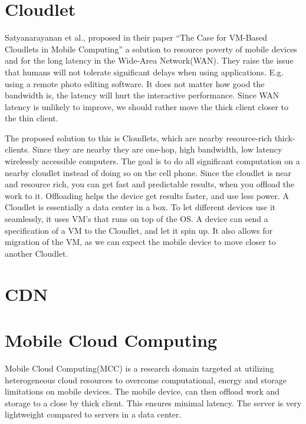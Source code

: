 

\section{Cloudlet} \label{cloudlet} 
Satyanarayanan et al., proposed in their paper “The Case for VM-Based Cloudlets in Mobile Computing”\cite{satyanarayanan_case_2009} a solution to resource poverty of mobile devices and for the long latency in the Wide-Area Network(WAN). They raise the issue that humans will not tolerate significant delays when using applications. E.g. using a remote photo editing software. It does not matter how good the bandwidth is, the latency will hurt the interactive performance. Since WAN latency is unlikely to improve, we should rather move the thick client closer to the thin client. 

The proposed solution to this is Cloudlets, which are nearby resource-rich thick-clients. Since they are nearby they are one-hop, high bandwidth, low latency wirelessly accessible computers. The goal is to do all significant computation on a nearby cloudlet instead of doing so on the cell phone. Since the cloudlet is near and resource rich, you can get fast and predictable results, when you offload the work to it. Offloading helps the device get results faster, and use less power. A Cloudlet is essentially a data center in a box. To let different devices use it seamlessly, it uses VM’s that runs on top of the OS. A device can send a specification of a VM to the Cloudlet, and let it spin up. It also allows for migration of the VM, as we can expect the mobile device to move closer to another Cloudlet.


\section{CDN}


\section{Mobile Cloud Computing}
Mobile Cloud Computing(MCC) is a research domain targeted at utilizing heterogeneous cloud resources to overcome computational, energy and storage limitations on mobile devices\cite{sanaei_heterogeneity_2014}\cite{naha_fog_2018}. The mobile device, can then offload work and storage to a close by thick client. This ensures minimal latency. The server is very lightweight compared to servers in a data center.

